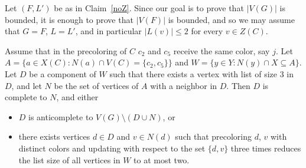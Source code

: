 \documentclass[11pt]{article}
\begin{document}
Let $(F,L')$ be as in Claim~\ref{noZ}. 
Since our goal is to prove that $|V(G)|$ is bounded, it is enough to prove that
$|V(F)|$ is bounded, and so  we may assume that $G=F$, $L=L'$, and in 
particular $|L(v)| \leq 2$ for every $v \in Z(C)$. 

\begin{claim}\label{compsW}
Assume that in the precoloring of $C$ $c_2$ and $c_5$ receive the same color, 
say $j$.
Let $A=\{a \in X(C) : N(a) \cap V(C)=\{c_2,c_5\}\}$ and $W=\{y \in Y : N(y) \cap X \subseteq A \}$. 
Let $D$ be a component of $W$ such that there exists a vertex with list of size $3$ in $D$, and let $N$ be the set of vertices of $A$ with a neighbor in $D$.
Then $D$ is complete to $N$, and either 
\begin{itemize}
	\item $D$ is anticomplete to $V(G) \setminus (D \cup N)$, or
	\item there exists vertices $d\in D$ and $v\in N(d)$ such that precoloring $d$, $v$ with distinct colors and updating with respect to the set $\{d,v\}$ three times reduces the list size of all vertices in $W$ to at most two.
\end{itemize}
\end{claim}
\end{document}
